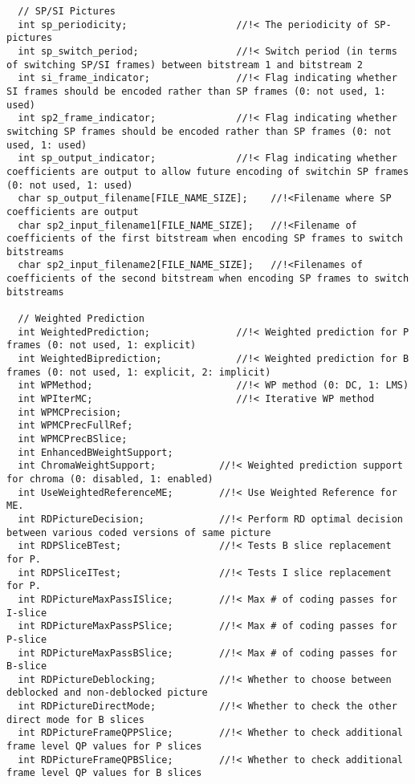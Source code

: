 \begin{lstlisting}
  // SP/SI Pictures
  int sp_periodicity;                   //!< The periodicity of SP-pictures
  int sp_switch_period;                 //!< Switch period (in terms of switching SP/SI frames) between bitstream 1 and bitstream 2
  int si_frame_indicator;               //!< Flag indicating whether SI frames should be encoded rather than SP frames (0: not used, 1: used)
  int sp2_frame_indicator;              //!< Flag indicating whether switching SP frames should be encoded rather than SP frames (0: not used, 1: used)
  int sp_output_indicator;              //!< Flag indicating whether coefficients are output to allow future encoding of switchin SP frames (0: not used, 1: used)
  char sp_output_filename[FILE_NAME_SIZE];    //!<Filename where SP coefficients are output
  char sp2_input_filename1[FILE_NAME_SIZE];   //!<Filename of coefficients of the first bitstream when encoding SP frames to switch bitstreams
  char sp2_input_filename2[FILE_NAME_SIZE];   //!<Filenames of coefficients of the second bitstream when encoding SP frames to switch bitstreams

  // Weighted Prediction
  int WeightedPrediction;               //!< Weighted prediction for P frames (0: not used, 1: explicit)
  int WeightedBiprediction;             //!< Weighted prediction for B frames (0: not used, 1: explicit, 2: implicit)
  int WPMethod;                         //!< WP method (0: DC, 1: LMS)
  int WPIterMC;                         //!< Iterative WP method
  int WPMCPrecision;
  int WPMCPrecFullRef;
  int WPMCPrecBSlice;
  int EnhancedBWeightSupport;
  int ChromaWeightSupport;           //!< Weighted prediction support for chroma (0: disabled, 1: enabled)
  int UseWeightedReferenceME;        //!< Use Weighted Reference for ME.
  int RDPictureDecision;             //!< Perform RD optimal decision between various coded versions of same picture
  int RDPSliceBTest;                 //!< Tests B slice replacement for P.
  int RDPSliceITest;                 //!< Tests I slice replacement for P.
  int RDPictureMaxPassISlice;        //!< Max # of coding passes for I-slice
  int RDPictureMaxPassPSlice;        //!< Max # of coding passes for P-slice
  int RDPictureMaxPassBSlice;        //!< Max # of coding passes for B-slice
  int RDPictureDeblocking;           //!< Whether to choose between deblocked and non-deblocked picture
  int RDPictureDirectMode;           //!< Whether to check the other direct mode for B slices
  int RDPictureFrameQPPSlice;        //!< Whether to check additional frame level QP values for P slices
  int RDPictureFrameQPBSlice;        //!< Whether to check additional frame level QP values for B slices


\end{lstlisting}
